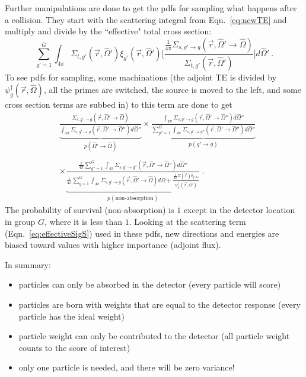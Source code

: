 \documentclass[12pt,twoside]{article}
\newcommand{\vOmega}{\ensuremath{\hat{\Omega}}}
\begin{document}
Further manipulations are done to get the pdfs for sampling what happens after a collision. They start with the scattering integral from Eqn.~\eqref{eq:newTE} and multiply and divide by the ``effective" total cross section:
\begin{equation}
 \sum_{g'=1}^{G} \int_{4 \pi}  \Sigma_{t,g'}(\vec{r}, \vOmega') \xi_{g'}(\vec{r}, \vOmega') \Biggl[ \frac{\frac{1}{4 \pi} \Sigma_{s,g' \rightarrow g}(\vec{r}, \vOmega' \rightarrow \vOmega)}{\Sigma_{t,g'}(\vec{r}, \vOmega')} \Biggr]  d \vOmega' \:.
 \label{eq:modScattering}
\end{equation}
To see pdfs for sampling, some machinations (the adjoint TE is divided by $\psi^{\dagger}_{g}(\vec{r}, \vOmega)$, all the primes are switched, the source is moved to the left, and some cross section terms are subbed in) to this term are done to get
\begin{align}
   &\underbrace{\frac{\Sigma_{s, g' \rightarrow g}(\vec{r}, \vOmega' \rightarrow \vOmega)}{\int_{4 \pi} \Sigma_{s, g' \rightarrow g}(\vec{r}, \vOmega' \rightarrow \vOmega'') d\vOmega''}}_{p(\vOmega' \rightarrow \vOmega)} \times 
   \underbrace{\frac{\int_{4 \pi} \Sigma_{s, g' \rightarrow g}(\vec{r}, \vOmega' \rightarrow \vOmega'') d\vOmega''}{\sum_{g''=1}^{G} \int_{4 \pi} \Sigma_{s, g' \rightarrow g''}(\vec{r}, \vOmega' \rightarrow \vOmega'') d\vOmega''}}_{p(g' \rightarrow g)}\nonumber \\
  &\nonumber\\
  &\times  \underbrace{\frac{\frac{1}{4 \pi}\sum_{g''=1}^{G} \int_{4 \pi} \Sigma_{s, g' \rightarrow g''}(\vec{r}, \vOmega' \rightarrow \vOmega'') d\vOmega''}
  {\frac{1}{4 \pi}\sum_{g=1}^{G} \int_{4 \pi} \Sigma_{s, g' \rightarrow g}(\vec{r}, \vOmega' \rightarrow \vOmega) d\vOmega 
  + \frac{\frac{1}{4\pi} \Sigma(\vec{r}) \delta_{g',G}}{\psi^{\dagger}_{g'}(\vec{r}, \vOmega')}}}_{p(\text{non-absorption})} \:.
  \label{eq:scatteringPDFs}
\end{align}
The probability of survival (non-absorption) is $1$ except in the detector location in group $G$, where it is less than $1$. Looking at the scattering term (Eqn.~\eqref{eq:effectiveSigS}) used in these pdfs, new directions and energies are biased toward values with higher importance (adjoint flux). 

In summary:
\begin{itemize}
\item particles can only be absorbed in the detector (every particle will score)
\item particles are born with weights that are equal to the detector response (every particle has the ideal weight)
\item particle weight can only be contributed to the detector (all particle weight counts to the score of interest)
\item only one particle is needed, and there will be zero variance!
\end{itemize} 
\end{document}
